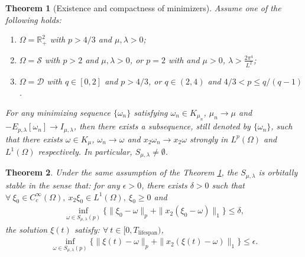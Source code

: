 \documentclass[11pt,letterpaper]{amsart}
\newtheorem{thm}{Theorem}[section]
\theoremstyle{definition}
\theoremstyle{remark}
\newcommand{\D}{\mathcal{D}}
\renewcommand{\S}{\mathcal{S}}
\newcommand{\R}{\mathbb{R}}
\renewcommand{\O}{\Omega}
\numberwithin{equation}{section}
\begin{document}
\begin{thm}[Existence and compactness of minimizers]\label{thm:general convergence theorem without L1}
    Assume one of the following holds:
    \begin{enumerate}[label=\ref{thm:general convergence theorem without L1}.\arabic*]
        \item \label{case:general convergence on half-plane} $\O=\R^2_+$ with $p>4/3$ and $\mu,\lambda>0$; 
        \item \label{case:general convergence on strips} $\O=\S$ with $p > 2$ and $\mu,\lambda>0$, or $p = 2$ with and $\mu>0$, $\lambda>\frac{2\pi^4}{L^2}$;
        \item \label{case:general convergence on finite volume} $\O=\D$ with $q\in[0,2]$ and $p>4/3$, or $q\in(2,4)$ and $ 4/3< p \leq q/(q-1)$.
    \end{enumerate}
     
    For any minimizing sequence $\{\omega_n\}$ satisfying $\omega_n\in K_{\mu_n}$, $\mu_n \rightarrow \mu $ and $-E_{p,\lambda}[\omega_n] \rightarrow I_{\mu,\lambda}$, then there exists a subsequence, still denoted by $\{\omega_n\}$, such that there exists $\omega\in K_{\mu}$, 
    $\omega_n\rightarrow\omega$ and $x_2\omega_n\rightarrow x_2\omega$ strongly in $L^p(\O)$ and $L^1(\O)$ respectively. In particular, $S_{\mu,\lambda} \neq \emptyset$.
\end{thm}

\begin{thm}\label{thm:stable wrt minimizer}
    Under the same assumption of the Theorem \ref{thm:general convergence theorem without L1}, the $S_{\mu,\lambda}$ is orbitally stable in the sense that: for any $\epsilon>0$, there exists $\delta>0$ such that $\forall ~ \xi_0\in C_c^{\infty}(\Omega), ~ x_2\xi_0\in L^1(\Omega), ~ \xi_0\geq0$ and 
    \begin{align*}
        \inf_{\omega\in S_{\mu,\lambda}(p)}\Big\{ \|\xi_0-\omega\|_{p}+\|x_2(\xi_0-\omega)\|_{1} \Big\}\leq \delta,
    \end{align*}
    the solution $\xi(t)$ satisfy: $\forall ~ t \in [0,T_{\text{lifespan}})$,
    \begin{align}
        \inf_{\omega\in S_{\mu,\lambda}(p)}\Big\{ \|\xi(t)-\omega\|_{p}+\|x_2(\xi(t)-\omega)\|_{1} \Big\}\leq \epsilon. \label{eqn:stable result}
    \end{align}
\end{thm}
\end{document}
